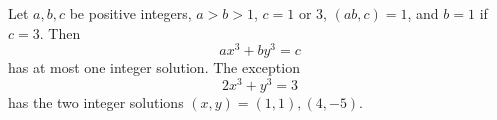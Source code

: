 \begin{proposition}
    Let $a,b,c$ be positive integers, $a>b>1$, $c=1$ or $3$, $(ab,c)=1$, and $b=1$ if $c=3$. Then
\[
    ax^3+by^3=c
\]
    has at most one integer solution. The exception
\[
    2x^3+y^3=3
\]
    has the two integer solutions $(x,y)=(1,1),(4,-5)$.
\end{proposition}

